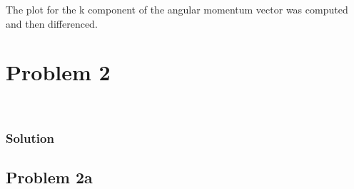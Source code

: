 \documentclass[conf]{new-aiaa}
\begin{document}
The plot for the k component of the angular momentum vector was computed and then differenced. 



\newpage

\section*{Problem 2} 

\begin{center}
	 \\
\end{center}


\subsubsection*{Solution} 




\newpage

\subsection*{Problem 2a} 

\begin{center}
	 \\
\end{center}
\end{document}
